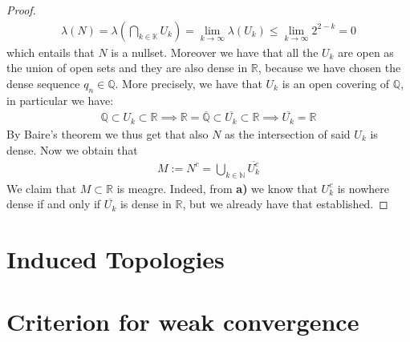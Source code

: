 \documentclass[12pt,a4paper]{article}
\begin{document}
\begin{proof}
\begin{align*}
\lambda (N) = \lambda \left( \bigcap_{k \in \mathbb{K}} U_k \right) = \lim_{k \to \infty} \lambda (U_k) \leq \lim_{k \to \infty} 2^{2-k} = 0 
\end{align*}
which entails that $N$ is a nullset. 
\newpage
Moreover we have that all the $U_k$ are open as the union of open sets and they are also dense in $\mathbb{R}$, because we have chosen the dense sequence $q_n \in \mathbb{Q}$. More precisely, we have that $U_k$ is an open covering of $\mathbb{Q}$, in particular we have:
\begin{align*}
\mathbb{Q} \subset U_k \subset \mathbb{R} \implies \mathbb{R}=\overline{\mathbb{Q}} \subset \overline{U_k} \subset \mathbb{R} \implies \overline{U_k} = \mathbb{R}
\end{align*}
By Baire's theorem we thus get that also $N$ as the intersection of said $U_k$ is dense. Now we obtain that
\begin{align*}
M:= N^c = \bigcup_{k \in \mathbb{N}} \overline{U_k^c}
\end{align*}
We claim that $M \subset \mathbb{R}$ is meagre. Indeed, from \textbf{a)} we know that $U_k^c$ is nowhere dense if and only if $\overline{U_k}$ is dense in $\mathbb{R}$, but we already have that established. 
\end{proof}
\section{Induced Topologies}
\section{Criterion for weak convergence}
\end{document}
